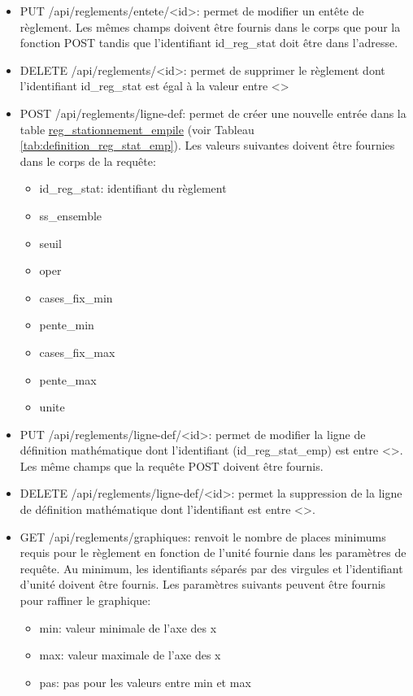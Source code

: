 \begin{itemize}
    \begin{itemize}
        \item description
        \item annee\_debut\_reg
        \item annee\_fin\_reg
        \item texte\_loi
        \item article\_loi
        \item paragraphe\_loi
        \item ville
    \end{itemize}
    \item PUT /api/reglements/entete/<id>: permet de modifier un entête de règlement. Les mêmes champs doivent être fournis dans le corps que pour la fonction POST tandis que l'identifiant id\_reg\_stat doit être dans l'adresse.
    \item DELETE /api/reglements/<id>: permet de supprimer le règlement dont l'identifiant id\_reg\_stat est égal à la valeur entre <>
    \item POST /api/reglements/ligne-def: permet de créer une nouvelle entrée dans la table \ul{reg\_stationnement\_empile} (voir Tableau \ref{tab:definition_reg_stat_emp}). Les valeurs suivantes doivent être fournies dans le corps de la requête:
    \begin{itemize}
        \item id\_reg\_stat: identifiant du règlement
        \item ss\_ensemble
        \item seuil
        \item oper
        \item cases\_fix\_min
        \item pente\_min
        \item cases\_fix\_max
        \item pente\_max
        \item unite
    \end{itemize}
    \item PUT /api/reglements/ligne-def/<id>: permet de modifier la ligne de définition mathématique dont l'identifiant (id\_reg\_stat\_emp) est entre <>. Les même champs que la requête POST doivent être fournis.
    \item DELETE /api/reglements/ligne-def/<id>: permet la suppression de la ligne de définition mathématique dont l'identifiant est entre <>.
    \item GET /api/reglements/graphiques: renvoit le nombre de places minimums requis pour le règlement en fonction de l'unité fournie dans les paramètres de requête. Au minimum, les identifiants séparés par des virgules et l'identifiant d'unité doivent être fournis. Les paramètres suivants peuvent être fournis pour raffiner le graphique:
    \begin{itemize}
        \item min: valeur minimale de l'axe des x
        \item max: valeur maximale de l'axe des x
        \item pas: pas pour les valeurs entre min et max
    \end{itemize}
\end{itemize}
